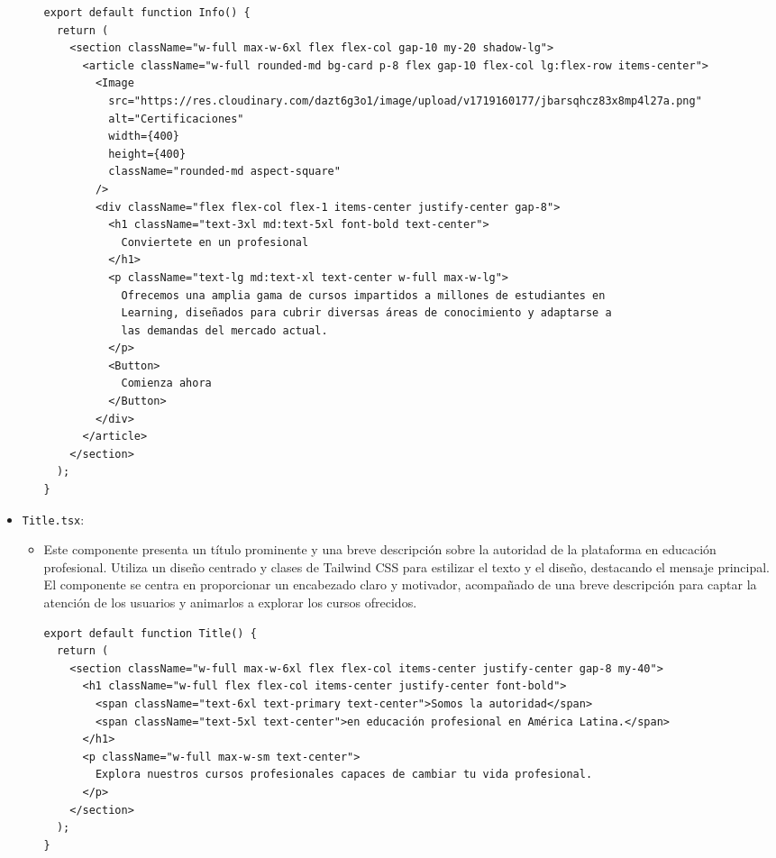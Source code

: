 \begin{itemize}
\begin{itemize}
\begin{verbatim}
export default function Info() {
  return (
    <section className="w-full max-w-6xl flex flex-col gap-10 my-20 shadow-lg">
      <article className="w-full rounded-md bg-card p-8 flex gap-10 flex-col lg:flex-row items-center">
        <Image
          src="https://res.cloudinary.com/dazt6g3o1/image/upload/v1719160177/jbarsqhcz83x8mp4l27a.png"
          alt="Certificaciones"
          width={400}
          height={400}
          className="rounded-md aspect-square"
        />
        <div className="flex flex-col flex-1 items-center justify-center gap-8">
          <h1 className="text-3xl md:text-5xl font-bold text-center">
            Conviertete en un profesional
          </h1>
          <p className="text-lg md:text-xl text-center w-full max-w-lg">
            Ofrecemos una amplia gama de cursos impartidos a millones de estudiantes en
            Learning, diseñados para cubrir diversas áreas de conocimiento y adaptarse a
            las demandas del mercado actual.
          </p>
          <Button>
            Comienza ahora
          </Button>
        </div>
      </article>
    </section>
  );
}
    \end{verbatim}
  \end{itemize}
  \item \texttt{Title.tsx}:
  \begin{itemize}
    \item Este componente presenta un título prominente y una breve descripción sobre la autoridad de la plataforma en educación profesional. Utiliza un diseño centrado y clases de Tailwind CSS para estilizar el texto y el diseño, destacando el mensaje principal. El componente se centra en proporcionar un encabezado claro y motivador, acompañado de una breve descripción para captar la atención de los usuarios y animarlos a explorar los cursos ofrecidos.
    \begin{verbatim}
export default function Title() {
  return (
    <section className="w-full max-w-6xl flex flex-col items-center justify-center gap-8 my-40">
      <h1 className="w-full flex flex-col items-center justify-center font-bold">
        <span className="text-6xl text-primary text-center">Somos la autoridad</span>
        <span className="text-5xl text-center">en educación profesional en América Latina.</span>
      </h1>
      <p className="w-full max-w-sm text-center">
        Explora nuestros cursos profesionales capaces de cambiar tu vida profesional.
      </p>
    </section>
  );
}
    \end{verbatim}
  \end{itemize}  
\end{itemize}

